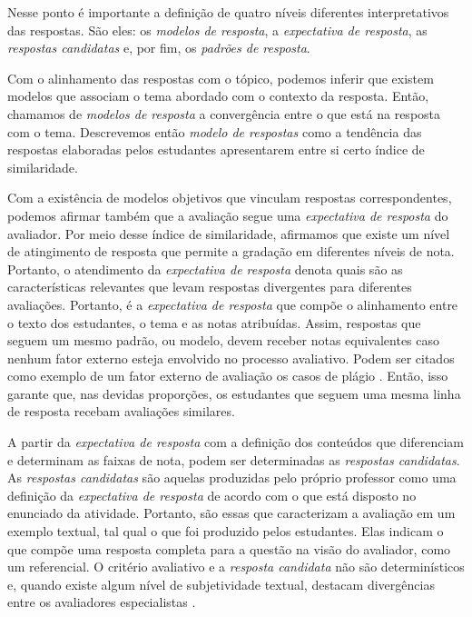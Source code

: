 Nesse ponto é importante a definição de quatro níveis diferentes interpretativos das respostas. São eles: os \textit{modelos de resposta}, a \textit{expectativa de resposta}, as \textit{respostas candidatas} e, por fim, os \textit{padrões de resposta}. 


Com o alinhamento das respostas com o tópico, podemos inferir que existem modelos que associam o tema abordado com o contexto da resposta. Então, chamamos de \textit{modelos de resposta} a convergência entre o que está na resposta com o tema. Descrevemos então \textit{modelo de respostas} como a tendência das respostas elaboradas pelos estudantes apresentarem entre si certo índice de similaridade.

Com a existência de modelos objetivos que vinculam respostas correspondentes, podemos afirmar também que a avaliação segue uma \textit{expectativa de resposta} do avaliador. Por meio desse índice de similaridade, afirmamos que existe um nível de atingimento de resposta que permite a gradação em diferentes níveis de nota. Portanto, o atendimento da \textit{expectativa de resposta} denota quais são as características relevantes que levam respostas divergentes para  diferentes avaliações. Portanto, é a \textit{expectativa de resposta} que compõe o alinhamento entre o texto dos estudantes, o tema e as notas atribuídas. Assim, respostas que seguem um mesmo padrão, ou modelo, devem receber notas equivalentes caso nenhum fator externo esteja envolvido no processo avaliativo. Podem ser citados como exemplo de um fator externo de avaliação os casos de plágio \cite{campana-filho2017}. Então, isso garante que, nas devidas proporções, os estudantes que seguem uma mesma linha de resposta recebam avaliações similares.

A partir da \textit{expectativa de resposta} com a definição dos conteúdos que diferenciam e determinam as faixas de nota, podem ser determinadas as \textit{respostas candidatas}. As \textit{respostas candidatas} são aquelas produzidas pelo próprio professor como uma definição da \textit{expectativa de resposta} de acordo com o que está disposto no enunciado da atividade. Portanto, são essas que caracterizam a avaliação em um exemplo textual, tal qual o que foi produzido pelos estudantes. Elas indicam o que compõe uma resposta completa para a questão na visão do avaliador, como um referencial. O critério avaliativo e a \textit{resposta candidata} não são determinísticos e, quando existe algum nível de subjetividade textual, destacam divergências entre os avaliadores especialistas \cite{pado2021}.

